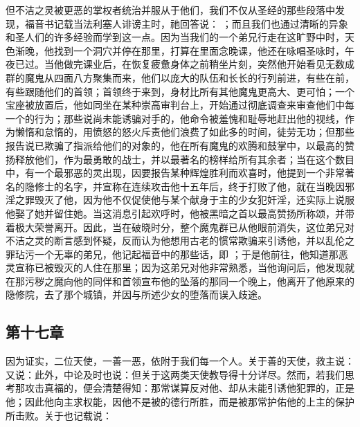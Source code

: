 \par

但不洁之灵被更恶的掌权者统治并服从于他们，我们不仅从圣经的那些段落中发现，福音书记载当法利塞人诽谤主时，祂回答说： ；而且我们也通过清晰的异象和圣人们的许多经验而学到这一点。因为当我们的一个弟兄行走在这旷野中时，天色渐晚，他找到一个洞穴并停在那里，打算在里面念晚课，他还在咏唱圣咏时，午夜已过。当他做完课业后，在恢复疲惫身体之前稍坐片刻，突然他开始看见无数成群的魔鬼从四面八方聚集而来，他们以庞大的队伍和长长的行列前进，有些在前，有些跟随他们的首领；首领终于来到，身材比所有其他魔鬼更高大、更可怕；一个宝座被放置后，他如同坐在某种崇高审判台上，开始通过彻底调查来审查他们中每一个的行为；那些说尚未能诱骗对手的，他命令被羞愧和耻辱地赶出他的视线，作为懒惰和怠惰的，用愤怒的怒火斥责他们浪费了如此多的时间，徒劳无功；但那些报告说已欺骗了指派给他们的对象的，他在所有魔鬼的欢腾和鼓掌中，以最高的赞扬释放他们，作为最勇敢的战士，并以最著名的榜样给所有其余者；当在这个数目中，有一个最邪恶的灵出现，因要报告某种辉煌胜利而欢喜时，他提到一个非常著名的隐修士的名字，并宣称在连续攻击他十五年后，终于打败了他，就在当晚因邪淫之罪毁灭了他，因为他不仅促使他与某个献身于主的少女犯奸淫，还实际上说服他娶了她并留住她。当这消息引起欢呼时，他被黑暗之首以最高赞扬所称颂，并带着极大荣誉离开。因此，当在破晓时分，整个魔鬼群已从他眼前消失，这位弟兄对不洁之灵的断言感到怀疑，反而认为他想用古老的惯常欺骗来引诱他，并以乱伦之罪玷污一个无辜的弟兄，他记起福音中的那些话，即 ；于是他前往，他知道那恶灵宣称已被毁灭的人住在那里；因为这弟兄对他非常熟悉，当他询问后，他发现就在那污秽之魔向他的同伴和首领宣布他的坠落的那同一个晚上，他离开了他原来的隐修院，去了那个城镇，并因与所述少女的堕落而误入歧途。\par


\subsection{第十七章}

\par

因为证实，二位天使，一善一恶，依附于我们每一个人。关于善的天使，救主说：又说：此外，中论及时也说：但关于这两类天使教导得十分详尽。然而，若我们思考那攻击真福的，便会清楚得知：那常谋算反对他、却从未能引诱他犯罪的，正是他；因此他向主求权能，因他不是被的德行所胜，而是被那常护佑他的上主的保护所击败。关于也记载说：\par

